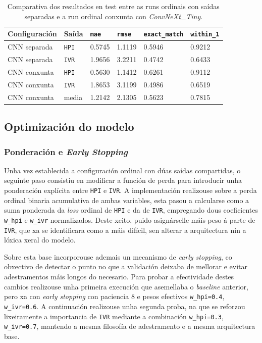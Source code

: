 {
\begin{table}[htbp]
    \centering
    \footnotesize
    \setlength{\tabcolsep}{4pt}
    \begin{tabular}{p{}|p{}|p{}|p{}|p{}|p{}} 
        \rowcolor{udcpink!25}
        \textbf{Configuración} & \textbf{Saída} & \textbf{\texttt{mae}} & \textbf{\texttt{rmse}} &  \textbf{\texttt{exact\_match}} & \textbf{\texttt{within\_1}} \\\hline
        CNN separada & \texttt{HPI} & 0.5745 & 1.1119 & 0.5946 & 0.9212 \\
        CNN separada & \texttt{IVR} & 1.9656 & 3.2211 & 0.4742 & 0.6433 \\
        CNN conxunta & \texttt{HPI} & 0.5630 & 1.1412 & 0.6261 & 0.9112 \\
        CNN conxunta & \texttt{IVR} & 1.8653 & 3.1199 & 0.4986 & 0.6519 \\
        CNN conxunta & media & 1.2142 & 2.1305 & 0.5623 & 0.7815 \\
    \end{tabular}
    \caption{Comparativa dos resultados en test entre as runs ordinais con saídas separadas e a run ordinal conxunta con \textit{ConvNeXt\_Tiny}.}
    \label{tab:comparativa-ordinal-separada-conxunta}
\end{table}
}

\subsection{Optimización do modelo}
\subsubsection{Ponderación e \textit{Early Stopping}}
Unha vez establecida a configuración ordinal con dúas saídas compartidas, o seguinte paso consistiu
en modificar a función de perda para introducir unha ponderación explícita entre \texttt{HPI} e
\texttt{IVR}. A implementación realizouse sobre a perda ordinal binaria acumulativa de ambas
variables, esta pasou a calcularse como a suma ponderada da
\textit{loss} ordinal de \texttt{HPI} e da de \texttt{IVR}, empregando dous coeficientes
\texttt{w\_hpi} e \texttt{w\_ivr} normalizados. Deste xeito, puido asignárselle máis peso á parte
de \texttt{IVR}, que xa se identificara como a máis difícil, sen alterar a arquitectura nin a lóxica
xeral do modelo.

Sobre esta base incorporouse ademais un mecanismo de \textit{early stopping}, co obxectivo de
detectar o punto no que a validación deixaba de mellorar e evitar adestramentos máis longos do
necesario. Para probar a efectividade destes cambios realizouse unha primeira execución que
asemellaba o \textit{baseline} anterior, pero xa con \textit{early stopping} con paciencia 8 e
pesos efectivos \texttt{w\_hpi=0.4}, \texttt{w\_ivr=0.6}. A continuación realizouse unha segunda
proba, na que se reforzou lixeiramente a importancia de \texttt{IVR} mediante a combinación
\texttt{w\_hpi=0.3}, \texttt{w\_ivr=0.7}, mantendo a mesma filosofía de adestramento e a mesma
arquitectura base.

